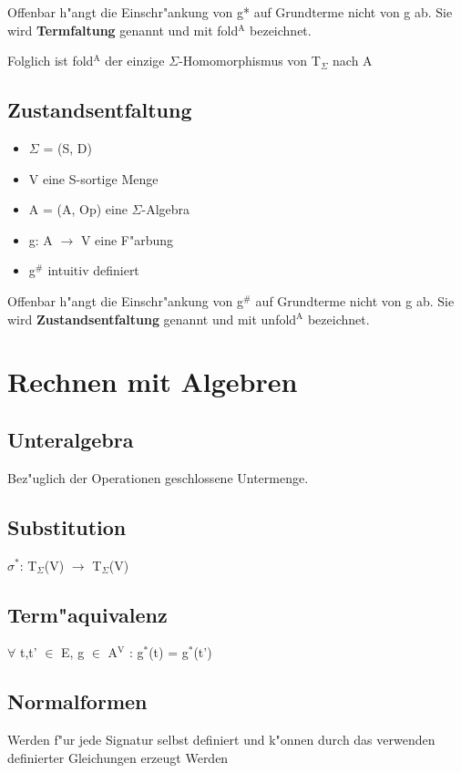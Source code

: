 \documentclass[11pt]{article}
\begin{document}
Offenbar h"angt die Einschr"ankung von g* auf Grundterme nicht von g ab. Sie wird \textbf{Termfaltung} genannt und mit fold$^{\text{A}}$ bezeichnet.

Folglich ist fold$^{\text{A}}$ der einzige $\Sigma$-Homomorphismus von T$_{\Sigma}$ nach A

\subsection{Zustandsentfaltung}
\label{sec-2-10}
\begin{itemize}
\item $\Sigma$ = (S, D)
\item V eine S-sortige Menge
\item A = (A, Op) eine $\Sigma$-Algebra
\item g: A $\to$ V eine F"arbung
\item g$^{\text{\#}}$ intuitiv definiert
\end{itemize}

Offenbar h"angt die Einschr"ankung von g$^{\text{\#}}$ auf Grundterme nicht von g ab. Sie wird \textbf{Zustandsentfaltung} genannt und mit unfold$^{\text{A}}$ bezeichnet.

\section{Rechnen mit Algebren}
\label{sec-3}

\subsection{Unteralgebra}
\label{sec-3-1}
Bez"uglich der Operationen geschlossene Untermenge.

\subsection{Substitution}
\label{sec-3-2}
$\sigma$$^{\text{*}}$: T$_{\Sigma}$(V) $\to$ T$_{\Sigma}$(V)

\subsection{Term"aquivalenz}
\label{sec-3-3}
$\forall$ t,t' $\in$ E, g $\in$ A$^{\text{V}}$ : g$^{\text{*}}$(t) = g$^{\text{*}}$(t')


\subsection{Normalformen}
\label{sec-3-4}
Werden f"ur jede Signatur selbst definiert und k"onnen durch das verwenden definierter Gleichungen erzeugt Werden
\end{document}

